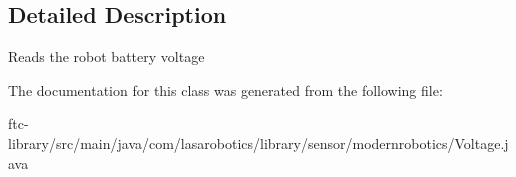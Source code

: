 \subsection{Detailed Description}
Reads the robot battery voltage 

The documentation for this class was generated from the following file\+:\begin{DoxyCompactItemize}
\item 
ftc-\/library/src/main/java/com/lasarobotics/library/sensor/modernrobotics/Voltage.\+java\end{DoxyCompactItemize}
